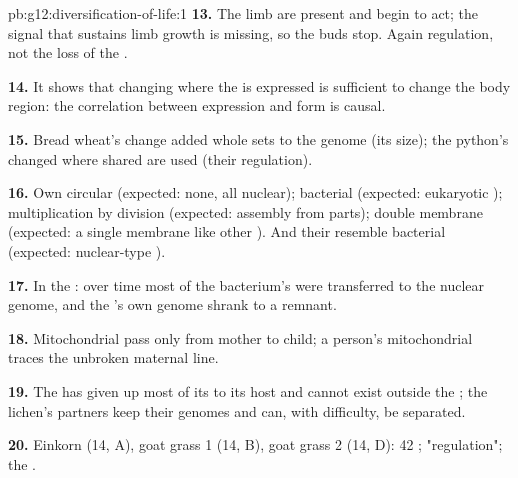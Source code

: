 \begin{solution}{pb:g12:diversification-of-life:1}
\textbf{13.} The limb  are present and begin to act; the signal
that sustains limb growth is missing, so the buds stop. Again
regulation, not the loss of the .

\textbf{14.} It shows that changing where the  is expressed is
sufficient to change the body region: the correlation between
expression and form is causal.

\textbf{15.} Bread wheat's change added whole sets to the genome (its
size); the python's changed where shared  are used (their
regulation).

\textbf{16.} Own circular  (expected: none, all  nuclear);
bacterial  (expected: eukaryotic ); multiplication
by division (expected: assembly from parts); double membrane
(expected: a single membrane like other ). And their 
resemble bacterial  (expected: nuclear-type ).

\textbf{17.} In the : over time most of the bacterium's 
were transferred to the nuclear genome, and the 's own genome
shrank to a remnant.

\textbf{18.} Mitochondrial  pass only from mother to child; a
person's mitochondrial  traces the unbroken maternal line.

\textbf{19.} The  has given up most of its  to its
host and cannot exist outside the ; the lichen's partners keep
their genomes and can, with difficulty, be separated.

\textbf{20.} Einkorn (14, A), goat grass 1 (14, B), goat grass 2 (14,
D): 42 ; "regulation"; the .
\end{solution}
